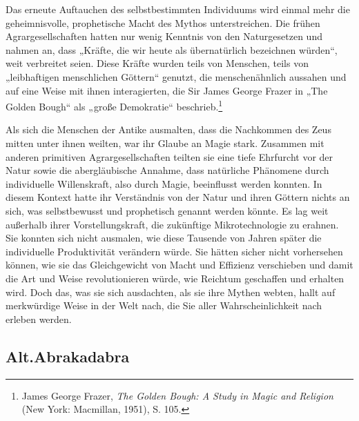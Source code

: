 \documentclass[
  a5paper,
  smalldemyvopaper,10pt,twoside,onecolumn,openright,extrafontsizes,hidelinks]{memoir}
\begin{document}
Das erneute Auftauchen des selbstbestimmten Individuums wird einmal mehr
die geheimnisvolle, prophetische Macht des Mythos unterstreichen. Die
frühen Agrargesellschaften hatten nur wenig Kenntnis von den
Naturgesetzen und nahmen an, dass „Kräfte, die wir heute als
übernatürlich bezeichnen würden``, weit verbreitet seien. Diese Kräfte
wurden teils von Menschen, teils von „leibhaftigen menschlichen
Göttern`` genutzt, die menschenähnlich aussahen und auf eine Weise mit
ihnen interagierten, die Sir James George Frazer in „The Golden Bough``
als „große Demokratie`` beschrieb.\footnote{James George Frazer,
  \emph{The Golden Bough: A Study in Magic and Religion} (New York:
  Macmillan, 1951), S. 105.}

Als sich die Menschen der Antike ausmalten, dass die Nachkommen des Zeus
mitten unter ihnen weilten, war ihr Glaube an Magie stark. Zusammen mit
anderen primitiven Agrargesellschaften teilten sie eine tiefe Ehrfurcht
vor der Natur sowie die abergläubische Annahme, dass natürliche
Phänomene durch individuelle Willenskraft, also durch Magie, beeinflusst
werden konnten. In diesem Kontext hatte ihr Verständnis von der Natur
und ihren Göttern nichts an sich, was selbstbewusst und prophetisch
genannt werden könnte. Es lag weit außerhalb ihrer Vorstellungskraft,
die zukünftige Mikrotechnologie zu erahnen. Sie konnten sich nicht
ausmalen, wie diese Tausende von Jahren später die individuelle
Produktivität verändern würde. Sie hätten sicher nicht vorhersehen
können, wie sie das Gleichgewicht von Macht und Effizienz verschieben
und damit die Art und Weise revolutionieren würde, wie Reichtum
geschaffen und erhalten wird. Doch das, was sie sich ausdachten, als sie
ihre Mythen webten, hallt auf merkwürdige Weise in der Welt nach, die
Sie aller Wahrscheinlichkeit nach erleben werden.

\subsection{Alt.Abrakadabra}\label{alt.abrakadabra}
\end{document}
